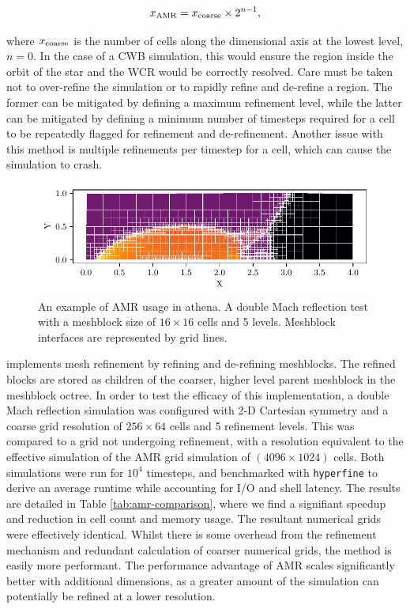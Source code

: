 \begin{equation}
  x_\text{AMR} = x_\text{coarse} \times 2^{n-1},
\end{equation}

\noindent
where $x_\text{coarse}$ is the number of cells along the dimensional axis at the lowest level, $n=0$.
In the case of a CWB simulation, this would ensure the region inside the orbit of the star and the WCR would be correctly resolved.
Care must be taken not to over-refine the simulation or to rapidly refine and de-refine a region.
The former can be mitigated by defining a maximum refinement level, while the latter can be mitigated by defining a minimum number of timesteps required for a cell to be repeatedly flagged for refinement and de-refinement.
Another issue with this method is multiple refinements per timestep for a cell, which can cause the simulation to crash.

\begin{figure}[ht]
  \centering
  \includegraphics{assets/refinement/dmach/plot.pdf}
  \caption[\athena{} adaptive mesh refinement example]{An example of AMR usage in athena. A double Mach reflection test with a meshblock size of $16 \times 16$ cells and 5 levels. Meshblock interfaces are represented by grid lines.}
  \label{fig:athena-amr-example}
\end{figure}

\athena{} implements mesh refinement by refining and de-refining meshblocks.
The refined blocks are stored as children of the coarser, higher level parent meshblock in the meshblock octree.
In order to test the efficacy of this implementation, a double Mach reflection simulation was configured with 2-D Cartesian symmetry and a coarse grid resolution of $256\times 64$ cells and 5 refinement levels.
This was compared to a grid not undergoing refinement, with a resolution equivalent to the effective simulation of the AMR grid simulation of $(4096\times 1024)$ cells.
Both simulations were run for $10^4$ timesteps, and benchmarked with \texttt{hyperfine} to derive an average runtime while accounting for I/O and shell latency.
The results are detailed in Table \ref{tab:amr-comparison}, where we find a signifiant speedup and reduction in cell count and memory usage.
The resultant numerical grids were effectively identical.
Whilst there is some overhead from the refinement mechanism and redundant calculation of coarser numerical grids, the method is easily more performant.
The performance advantage of AMR scales significantly better with additional dimensions, as a greater amount of the simulation can potentially be refined at a lower resolution.

